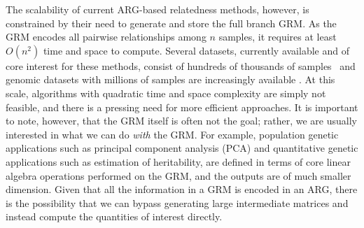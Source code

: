 
The scalability of current ARG-based relatedness methods, however, is constrained by
their need to generate and store the full branch GRM. As the GRM encodes all 
pairwise relationships among $n$ samples, it requires at least $O(n^2)$
time and space to compute. 
Several datasets, currently available and of core interest for these 
methods, consist of hundreds of thousands of 
samples~\citep{caulfield2017national,turnbull2018100,
bycroft2018genome,backman2021exome,Ros-Freixedes2022pig_wgs_variants,
halldorsson2022sequences,uk2023whole,all2024genomic}
and genomic datasets with millions of samples are increasingly available
\citep[e.g.][]{Cesarani2022, stark2024call,cook2025our, Cole2025Invited}.
At this scale, algorithms with quadratic time and space complexity are simply
not feasible, and there is a pressing need for more efficient approaches.
It is important to note, however, that the GRM itself is often not the goal;
rather, we are usually interested in what we can do \emph{with} the GRM.
For example, population genetic applications such as principal component analysis (PCA)
and quantitative genetic applications such as estimation of heritability, are
defined in terms of core linear algebra operations performed on the GRM,
and the outputs are of much smaller dimension. Given that all the information
in a GRM is encoded in an ARG, there is the possibility that we can bypass
generating large intermediate matrices and instead compute the quantities
of interest directly.



